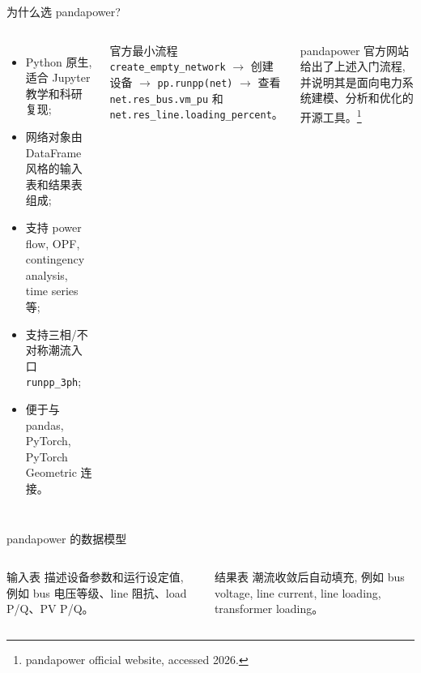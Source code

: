 \documentclass[aspectratio=169,10pt]{ctexbeamer}
\newcommand{\code}[1]{\texttt{#1}}
\begin{document}
\begin{frame}{为什么选 pandapower?}
\begin{columns}[T]
\begin{itemize}
  \item Python 原生, 适合 Jupyter 教学和科研复现;
  \item 网络对象由 DataFrame 风格的输入表和结果表组成;
  \item 支持 power flow, OPF, contingency analysis, time series 等;
  \item 支持三相/不对称潮流入口 \code{runpp\_3ph};
  \item 便于与 pandas, PyTorch, PyTorch Geometric 连接。
\end{itemize}
\begin{block}{官方最小流程}
\code{create\_empty\_network} $\rightarrow$ 创建设备 $\rightarrow$ \code{pp.runpp(net)} $\rightarrow$ 查看 \code{net.res\_bus.vm\_pu} 和 \code{net.res\_line.loading\_percent}。
\end{block}
\footnotesize pandapower 官方网站给出了上述入门流程, 并说明其是面向电力系统建模、分析和优化的开源工具。\footnote{pandapower official website, accessed 2026.}
\end{columns}
\end{frame}

\begin{frame}{pandapower 的数据模型}
\centering
{}
\vspace{1em}
\begin{columns}[T]
\begin{block}{输入表}
描述设备参数和运行设定值, 例如 bus 电压等级、line 阻抗、load P/Q、PV P/Q。
\end{block}
\begin{block}{结果表}
潮流收敛后自动填充, 例如 bus voltage, line current, line loading, transformer loading。
\end{block}
\end{columns}
\end{frame}
\end{document}
